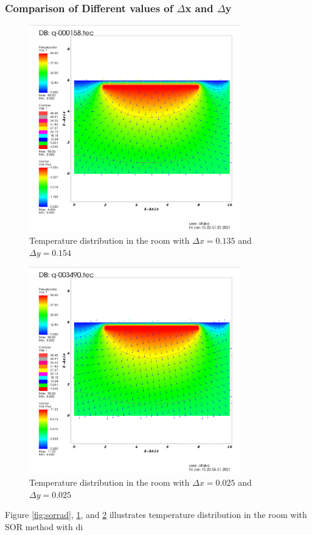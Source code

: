 \documentclass[letterpaper,12pt]{article}
\begin{document}
\subsubsection{Comparison of Different values of $\Delta$x and $\Delta$y}
\begin{figure}[H] 
	\centering 
	\includegraphics[max height=9cm]{graphs/imax75jmax40_default/imax75jmax40_default.png}
	\caption{Temperature distribution in the room with $\Delta x=0.135$ and $\Delta y = 0.154$}
 	\label{fig:7540}
\end{figure}
\begin{figure}[H] 
	\centering 
	\includegraphics[max height=9cm]{graphs/imax402jmax242_default/imax402jmax242_default.png}
	\caption{Temperature distribution in the room with $\Delta x=0.025$ and $\Delta y = 0.025$}
 	\label{fig:402242}
\end{figure}
Figure \ref{fig:sorrad}, \ref{fig:7540}, and \ref{fig:402242} illustrates temperature
distribution in the room with SOR method with di
\end{document}
